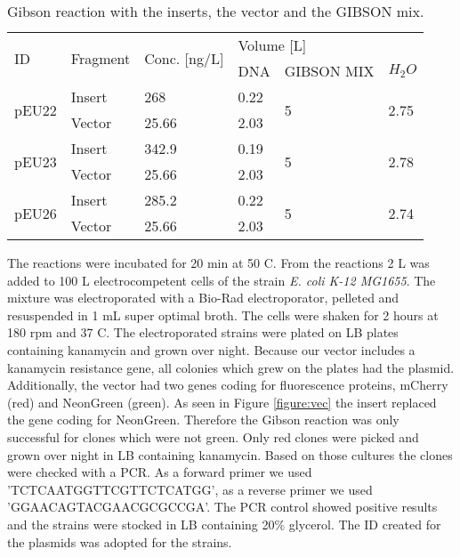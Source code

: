 \begin{table}[H]
	\begin{tabular}{|llllll|}
		\hline
		\multirow{2}{*}{ID}    & \multirow{2}{*}{Fragment} & \multirow{2}{*}{Conc. [ng/\textmu L]} & \multicolumn{3}{l|}{Volume [\textmu L]}           \\
		&                           &                                       & DNA  & GIBSON MIX         & $H_2O$                  \\ \hline
		\multirow{2}{*}{pEU22} & Insert                    & 268                                   & 0.22 & \multirow{2}{*}{5} & \multirow{2}{*}{2.75} \\
		& Vector                    & 25.66                                 & 2.03 &                    &                       \\ \hline
		\multirow{2}{*}{pEU23} & Insert                    & 342.9                                 & 0.19 & \multirow{2}{*}{5} & \multirow{2}{*}{2.78} \\
		& Vector                    & 25.66                                 & 2.03 &                    &                       \\ \hline
		\multirow{2}{*}{pEU26} & Insert                     & 285.2                                 & 0.22 & \multirow{2}{*}{5} & \multirow{2}{*}{2.74} \\
		& Vector                    & 25.66                                 & 2.03 &                    &                       \\ \hline
	\end{tabular}
	\caption{Gibson reaction with the inserts, the vector and the GIBSON mix.}
\end{table}
The reactions were incubated for 20 min at 50 \degree C. From the reactions 2 \textmu L was added to 100 \textmu L electrocompetent cells of the strain \textit{E. coli K-12 MG1655}. The mixture was electroporated with a Bio-Rad electroporator, pelleted and resuspended in 1 mL super optimal broth. The cells were shaken for 2 hours at 180 rpm and 37 \degree C. The electroporated strains were plated on LB plates containing kanamycin  and grown over night. Because our vector includes a kanamycin resistance gene, all colonies which grew on the plates had the plasmid.  Additionally, the vector had two genes coding for fluorescence proteins, mCherry (red) and NeonGreen (green). As seen in Figure \ref{figure:vec} the insert replaced the gene coding for NeonGreen. Therefore the Gibson reaction was only successful for clones which were not green. Only red clones were picked and grown over night in LB containing kanamycin. Based on those cultures the clones were checked with a PCR. As a forward primer we used 'TCTCAATGGTTCGTTCTCATGG', as a reverse primer we used 'GGAACAGTACGAACGCGCCGA'. The PCR control showed positive results and the strains were stocked in LB containing 20\% glycerol.
The ID created for the plasmids was adopted for the strains. 


